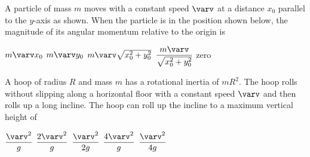 \documentclass{../../oss-apphys-exam}
\begin{document}
\genheader


\genmultidirections

\gengravity

\raggedcolumns
\begin{multicols*}{2}
  \begin{questions}
    \question A particle of mass $m$ moves with a constant speed $\varv$ at a
    distance $x_0$ parallel to the $y$-axis as shown. When the particle is in
    the position shown below, the magnitude of its angular momentum relative to
    the origin is
    \begin{center}
    \end{center}
    \begin{choices}
      \choice $m\varv x_0$
      \choice $m\varv y_0$
      \choice $m\varv\sqrt{x_0^2+y_0^2}$
      \choice $\dfrac{m\varv}{\sqrt{x_0^2+y_0^2}}$
      \choice zero
    \end{choices}
    
    \question A hoop of radius $R$ and mass $m$ has a rotational inertia of
    $mR^2$. The hoop rolls without slipping along a horizontal floor with a
    constant speed $\varv$ and then rolls up a long incline. The hoop can roll
    up the incline to a maximum vertical height of
    \begin{center}
    \end{center}
    \begin{choices}
      \choice$\dfrac{\varv^2}g$
      \choice$\dfrac{2\varv^2}{g}$
      \choice$\dfrac{\varv^2}{2g}$
      \choice$\dfrac{4\varv^2}{g}$
      \choice$\dfrac{\varv^2}{4g}$
    \end{choices}
    \columnbreak
    

\end{questions}
\end{multicols*}
\end{document}
